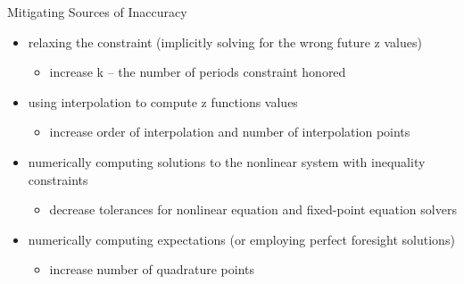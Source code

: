 \documentclass{beamer}
\begin{document}
\begin{frame}{Mitigating Sources of Inaccuracy}


\begin{itemize}
	\item relaxing the constraint (implicitly solving for the wrong future z values)
	\begin{itemize}
\item	increase k -- the number of periods constraint honored
	\end{itemize}
     \item using interpolation to compute z functions values
     	\begin{itemize}
     	\item 	increase order of interpolation and number of interpolation points
     	\end{itemize}    	
      \item numerically computing solutions to the nonlinear system with inequality constraints
      	\begin{itemize}
      \item		decrease tolerances for nonlinear equation and fixed-point equation solvers
      	\end{itemize}      	 
\item numerically computing expectations (or  employing perfect foresight solutions)
	\begin{itemize}
	\item	increase number of quadrature points
	\end{itemize}
\end{itemize}
%
\end{frame}
%
\end{document}
